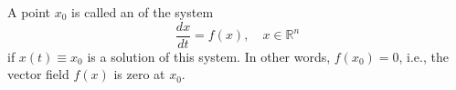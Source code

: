 A point \(x_0\) is called an  of the system
\[
\frac{dx}{dt} = f(x), \quad x \in \mathbb{R}^n
\]
if \(x(t) \equiv x_0\) is a solution of this system. In other words, \(f(x_0) = 0\), i.e., the vector field \(f(x)\) is zero at \(x_0\).
